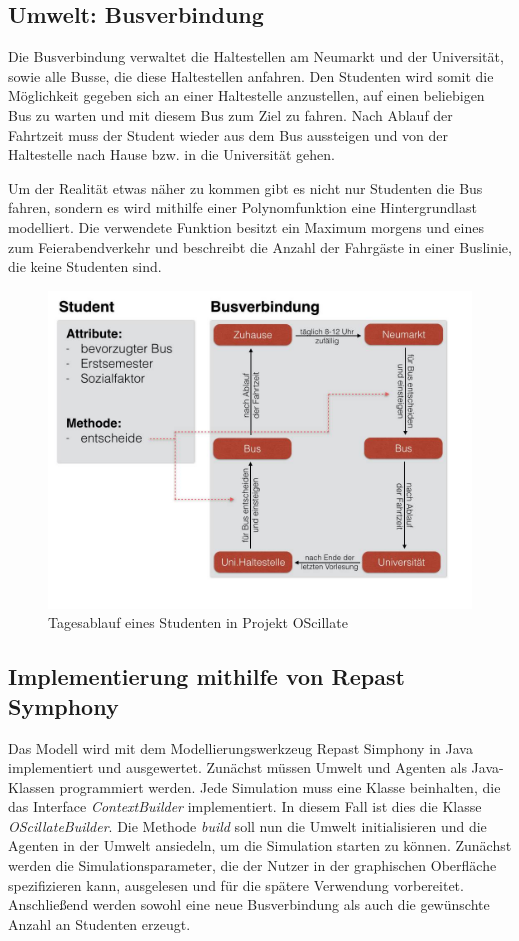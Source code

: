 \documentclass[12pt,a4paper]{scrartcl}
\begin{document}
\subsection{Umwelt: Busverbindung}\label{bus}
Die Busverbindung verwaltet die Haltestellen am Neumarkt und der Universität, sowie alle Busse, die diese Haltestellen anfahren. Den Studenten wird somit die Möglichkeit gegeben sich an einer Haltestelle anzustellen, auf einen beliebigen Bus zu warten und mit diesem Bus zum Ziel zu fahren. Nach Ablauf der Fahrtzeit muss der Student wieder aus dem Bus aussteigen und von der Haltestelle nach Hause bzw. in die Universität gehen. 

Um der Realität etwas näher zu kommen gibt es nicht nur Studenten die Bus fahren, sondern es wird mithilfe einer Polynomfunktion eine \glqq Hintergrundlast\grqq~ modelliert. Die verwendete Funktion besitzt ein Maximum morgens und eines zum Feierabendverkehr und beschreibt die Anzahl der Fahrgäste in einer Buslinie, die keine Studenten sind.

\begin{figure}[ht!]
\includegraphics[scale=0.4]{Ablaufdiagramm.jpg}
\caption{Tagesablauf eines Studenten in Projekt OScillate}
\label{ablauf}
\end{figure}


\subsection{Implementierung mithilfe von Repast Symphony}\label{repast}

Das Modell wird mit dem Modellierungswerkzeug Repast Simphony in Java implementiert und ausgewertet. Zunächst müssen Umwelt und Agenten als Java-Klassen programmiert werden. Jede Simulation muss eine Klasse beinhalten, die das Interface \textit{ContextBuilder} implementiert. In diesem Fall ist dies die Klasse \textit{OScillateBuilder}. Die Methode \textit{build} soll nun die Umwelt initialisieren und die Agenten in der Umwelt ansiedeln, um die Simulation starten zu können. Zunächst werden die Simulationsparameter, die der Nutzer in der graphischen Oberfläche spezifizieren kann, ausgelesen und für die spätere Verwendung vorbereitet. Anschließend werden sowohl eine neue Busverbindung als auch die gewünschte Anzahl an Studenten erzeugt.
\end{document}
